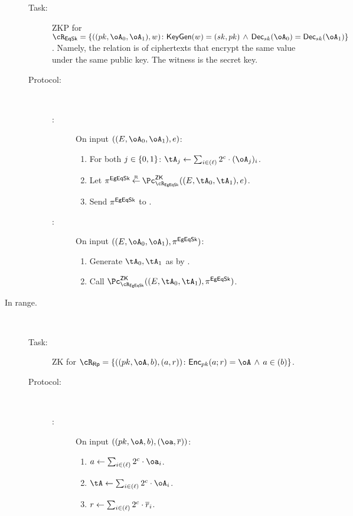 \begin{description}
\begin{description}
	\item[Task:] ZKP for  $\rEqSk =\rEqSkDef$. Namely, the relation  is of  ciphertexts that encrypt the  same value under the same public key. The witness is the secret key.
	
	\item[Protocol:] ~
	
	\begin{description}
		\item[\Pc:] On input $((E,\oA_0,\oA_1),e)$:
		
		\begin{enumerate}
			
			\item    For both $j\in \zo$:   $\tA_j \asn  \sum_{i\in (\ell)}    2^c \cdot (\oA_j)_i$. 
			
			\item  Let  $\pi^\EgEqSkS \getsr \pZK{\rEgEqSk}((E,\tA_0,\tA_1
			), e)$.
			
			\item Send $\pi^{{\sf EgEqSk}}$ to \Vc.
		\end{enumerate}
		
		
		\item[\Vc:] On input $((E,\oA_0,\oA_1),\pi^\EgEqSkS)$:
		
		\begin{enumerate}
			\item   Generate $\tA_0,\tA_1$ as by \Pc.
			\item  Call $\pZK{\rEgEqSk}((E,\tA_0,\tA_1), \pi^\EgEqSkS)$.
			
		\end{enumerate}
		
	\end{description}
	
	
\end{description}


\item[In range.]~  

\begin{description}
	\item[Task:] ZK for $\rRp =\rRpDef$.
	
	\item[Protocol:]~
	
	\begin{description}
	\item[\Pc:] On input $((\pk,\oA,b),(\oa,\orr))$:
	
	\begin{enumerate}
			\item   $a \asn  \sum_{i\in (\ell)}   2^c \cdot \oa_i$. 
		\item    $\tA \asn  \sum_{i\in (\ell)}    2^c \cdot \oA_i$. 
		\item    $r \leftarrow  \sum_{i\in (\ell)}  2^c \cdot \overline{r}_i$. 
        

\end{enumerate}
\end{description}
\end{description}
\end{description}
